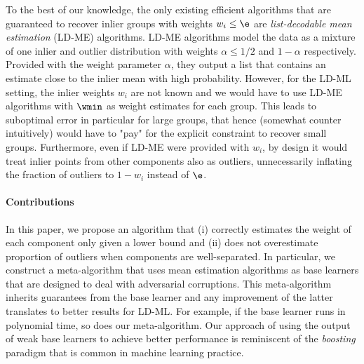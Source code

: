 To the best of our knowledge, the only existing efficient algorithms that are guaranteed to recover inlier groups with weights \(w_i \leq \e\) are \emph{list-decodable mean estimation} (LD-ME) algorithms. 
LD-ME algorithms model the data as a mixture of one inlier and outlier distribution with weights \(\alpha \leq 1/2\) and \(1 - \alpha\) respectively. Provided with the weight parameter \(\alpha\), they output a list that contains an estimate
close to the inlier mean with high probability. However, for the LD-ML setting,
the inlier weights $w_i$ are not known and we would have to use LD-ME algorithms
with $\wmin$ as weight estimates for each group.
This leads to suboptimal error in particular for 
large groups, that hence (somewhat counter intuitively) would have to "pay" for
the explicit constraint to recover small groups.
Furthermore, even if LD-ME were provided with \(w_i\), by design it would treat inlier points from other components also as outliers, unnecessarily inflating the fraction of outliers to \(1 - w_i\)
instead of \(\e\). 
\paragraph{Contributions}
In this paper, we propose an algorithm that (i) correctly estimates the weight of each component only given a lower bound and (ii) does not overestimate proportion of outliers when components are well-separated. 
In particular, we construct a meta-algorithm that uses mean estimation algorithms as base learners that are designed to deal with adversarial corruptions.
This meta-algorithm inherits guarantees from the base learner and any improvement of the latter translates to better results for LD-ML. For example, if the base learner runs in polynomial time, so does our meta-algorithm.
Our approach of using the output of weak base learners to achieve better performance is reminiscent of the \emph{boosting} paradigm that is common in machine learning practice. 

